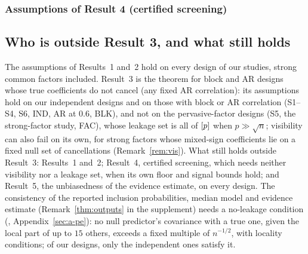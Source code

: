 \subsubsection{Assumptions of Result 4 (certified screening)}\label{sec:a-scr}


\subsection{Who is outside Result 3, and what still holds}\label{sec:who-outside}

The assumptions of Results~1 and~2 hold on every design of our studies, strong common factors included. Result~3 is the
theorem for block and AR designs whose true coefficients do not cancel (any fixed AR correlation): its assumptions hold on our independent designs and on those with block or
AR correlation (S1--S4, S6, IND, AR at $0.6$, BLK), and not on the pervasive-factor designs (S5, the strong-factor
study, FAC), whose leakage set is all of $[p]$ when $p\gg\sqrt n$; visibility can also fail on its own, for strong
factors whose mixed-sign coefficients lie on a fixed null set of cancellations (Remark~\ref{rem:vis}). What still holds outside
Result~3: Results~1 and~2; Result~4, certified screening, which needs neither visibility nor a leakage set, when its own
floor and signal bounds hold; and Result~5, the unbiasedness of the evidence estimate, on every design. The consistency of
the reported inclusion probabilities, median model and evidence estimate (Remark~\ref{thm:outputs} in the supplement)
needs a no-leakage condition (, Appendix~\ref{sec:a-pe}): no null predictor's covariance with a true one, given the local part of up
to $15$ others, exceeds a fixed multiple of $n^{-1/2}$, with locality conditions; of our designs, only the independent ones satisfy it.
